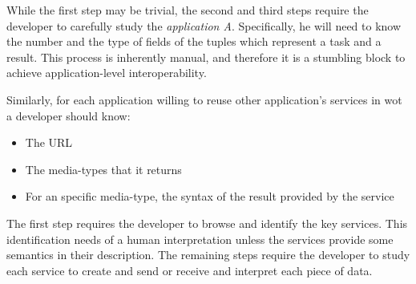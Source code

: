 While the first step may be trivial, the second and third steps require the developer to carefully study the \emph{application A}.
Specifically, he will need to know the number and the type of fields of the tuples which represent a task and a result.
This process is inherently manual, and therefore it is a stumbling block to achieve application-level interoperability.

\medskip

Similarly, for each application willing to reuse other application's services in \ac{wot} a developer should know:
\begin{itemize}
 \item The URL
 \item The media-types that it returns
 \item For an specific media-type, the syntax of the result provided by the service %
\end{itemize}


The first step requires the developer to browse and identify the key services.
This identification needs of a human interpretation unless the services provide some semantics in their description. %
The remaining steps require the developer to study each service to create and send or receive and interpret each piece of data.

